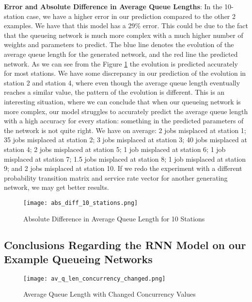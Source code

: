 \documentclass[a4paper,11pt,titlepage]{article}
\begin{document}
\textbf{Error and Absolute Difference in Average Queue Lengths}: In the 10-station case, we have a higher error in our prediction compared to the other 2 examples. We have that this model has a 29\% error. This could be due to the fact that the queueing network is much more complex with a much higher number of weights and parameters to predict. The blue line denotes the evolution of the average queue length for the generated network, and the red line the predicted network. As we can see from the Figure \ref{fig:abs_diff_10_stations} the evolution is predicted accurately for most stations. We have some discrepancy in our prediction of the evolution in station 2 and station 4, where even though the average queue length eventually reaches a similar value, the pattern of the evolution is different. This is an interesting situation, where we can conclude that when our queueing network is more complex, our model struggles to accurately predict the average queue length with a high accuracy for every station: something in the predicted parameters of the network is not quite right. We have on average: 2 jobs misplaced at station 1; 35 jobs misplaced at station 2; 3 jobs misplaced at station 3; 40 jobs misplaced at station 4; 2 jobs misplaced at station 5; 1 job misplaced at station 6; 1 job misplaced at station 7; 1.5 jobs misplaced at station 8; 1 job misplaced at station 9; and 2 jobs misplaced at station 10. If we redo the experiment with a different probability transition matrix and service rate vector for another generating network, we may get better results.

\begin{figure}[h!]
\begin{center}
\texttt{[image: abs\_diff\_10\_stations.png]}
\caption{Absolute Difference in Average Queue Length for 10 Stations}
\label{fig:abs_diff_10_stations}
\end{center}
\end{figure}

\subsection{Conclusions Regarding the RNN Model on our Example Queueing Networks}

\begin{figure}[h!]
\begin{center}
\texttt{[image: av\_q\_len\_concurrency\_changed.png]}
\caption{Average Queue Length with Changed Concurrency Values}
\label{fig:av_q_len_server_increased}
\end{center}
\end{figure}
\end{document}
